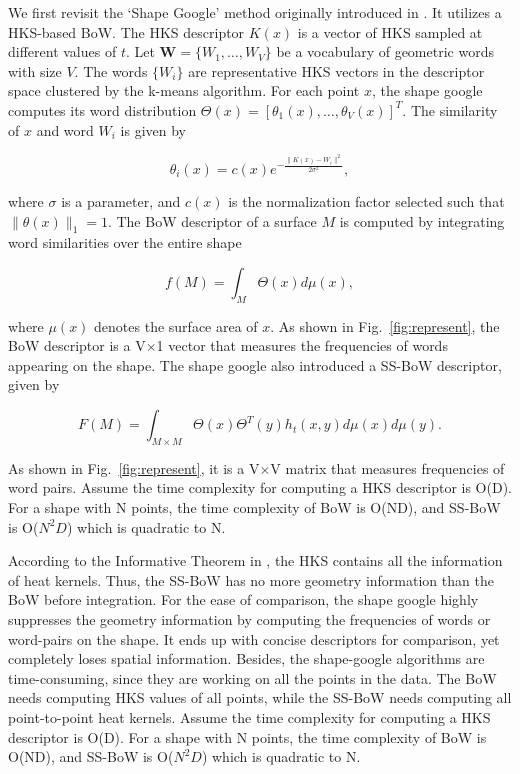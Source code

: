 We first revisit the `Shape Google' method originally introduced in \cite{Ovsjanikov:2009}. It utilizes a HKS-based BoW.
The HKS descriptor $K(x)$ is a vector of HKS sampled at different values of $t$. Let $\textbf{W}=\{W_1,\dots,W_V\}$ be a
vocabulary of geometric words with size $V$. The words $\{W_i\}$ are representative HKS vectors in the descriptor space
clustered by the k-means algorithm. For each point $x$, the shape google computes its word distribution
$\Theta(x)=[\theta_1(x),\dots,\theta_V(x)]^T$. The similarity of $x$ and word $W_i$ is given by

\begin{equation}\label{eq:similar}
\theta_i(x)=c(x)e^{-\frac{\|K(x)-W_i\|^2}{2\sigma^2}},
\end{equation}

where $\sigma$ is a parameter, and $c(x)$ is the normalization factor selected such that $\|\theta(x)\|_1 = 1$.
The BoW descriptor of a surface $M$ is computed by integrating word similarities over the entire shape

\begin{equation}
f(M)=\int_M\Theta(x)d\mu(x),
\end{equation}

where $\mu(x)$ denotes the surface area of $x$. As shown in Fig.~\ref{fig:represent},
the BoW descriptor is a V$\times$1 vector that measures the frequencies of words appearing
on the shape. The shape google also introduced a SS-BoW descriptor, given by

\begin{equation}
F(M)=\int_{M\times M}\Theta(x)\Theta^T(y)h_t(x,y)d\mu(x)d\mu(y).
\end{equation}

As shown in Fig.~\ref{fig:represent}, it is a V$\times$V matrix that measures frequencies of word pairs. Assume the time complexity for computing a HKS descriptor is O(D). For a shape with N points, the time complexity of BoW is O(ND), and SS-BoW is O($N^2 D$) which is quadratic to N.

According to the Informative Theorem in \cite{Sun:2009:CGF}, the HKS contains all the information of heat kernels. Thus, the SS-BoW has no more geometry information than the BoW before integration. For the ease of comparison, the shape google highly suppresses the geometry information by computing the frequencies of words or word-pairs on the shape. It ends up with concise descriptors for comparison, yet completely loses spatial information. Besides, the shape-google algorithms are time-consuming, since they are working on all the points in the data. The BoW needs computing HKS values of all points, while the SS-BoW needs computing all point-to-point heat kernels. Assume the time complexity for computing a HKS descriptor is O(D). For a shape with N points, the time complexity of BoW is O(ND), and SS-BoW is O($N^2 D$) which is quadratic to N.

